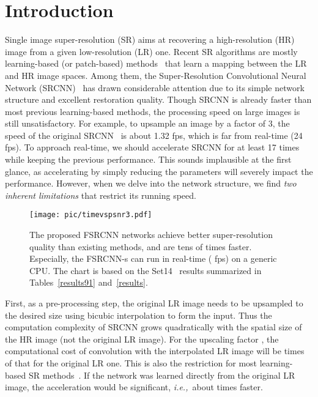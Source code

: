 \documentclass[runningheads]{llncs}
\newcommand{\ie}{\emph{i.e.,}}
\begin{document}
\section{Introduction}
Single image super-resolution (SR) aims at recovering a
high-resolution (HR) image from a given low-resolution (LR)
one. Recent SR algorithms are mostly
learning-based (or patch-based) methods~\cite{Dong2014,Dong2015,yang2013fast,Timofte2013,Timofte2014,Cui2014,Schulter2015,Wang2015}
that learn a mapping between the LR and HR image spaces.
Among them, the Super-Resolution Convolutional Neural Network (SRCNN)~\cite{Dong2014,Dong2015}  has drawn considerable attention due to its simple network structure and excellent restoration quality. Though SRCNN is already faster than most previous learning-based methods, the processing speed on large images
is still unsatisfactory. For example, to upsample an  image by a factor of 3, the speed of the original SRCNN~\cite{Dong2014} is about 1.32 fps, which is far from real-time (24 fps).
To approach real-time, we should accelerate SRCNN for at least 17 times while keeping the previous performance.
This sounds implausible at the first glance, as accelerating by simply reducing the parameters will severely impact the performance.
However, when we delve into the network structure, we find \textit{two inherent limitations} that restrict its running speed.

\begin{figure}[t]
\centering
  \texttt{[image: pic/timevspsnr3.pdf]}
\caption{The proposed FSRCNN networks achieve better super-resolution quality than existing methods, and are tens of times faster. Especially, the FSRCNN-s can run in real-time ( fps) on a generic CPU. The chart is based on the Set14~\cite{Zeyde2012} results summarized in Tables~\ref{results91} and~\ref{results}. }
  \label{fig:runtime}
\end{figure}

First, as a pre-processing step, the original LR image needs to
be upsampled to the desired size using bicubic interpolation to form the input. Thus the computation complexity of SRCNN grows quadratically with the spatial size of the HR image (not the original LR image). For the upscaling factor , the computational cost of convolution with the interpolated LR image will be  times of that for the original LR one. This is also the restriction for most learning-based SR methods~\cite{Yang2010a,yang2013fast,Timofte2013,Timofte2014,Schulter2015,Wang2015}. If the network was learned directly from the original LR image, the acceleration would be significant, \ie~about  times faster.
\end{document}
